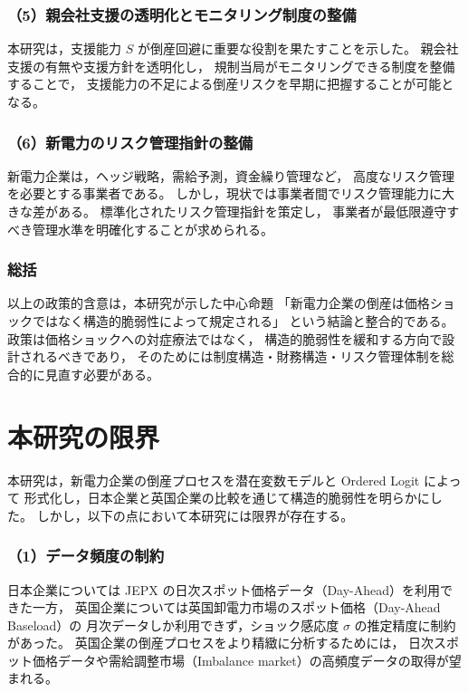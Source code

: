 \subsubsection*{（5）親会社支援の透明化とモニタリング制度の整備}

本研究は，支援能力 $S$ が倒産回避に重要な役割を果たすことを示した。
親会社支援の有無や支援方針を透明化し，
規制当局がモニタリングできる制度を整備することで，
支援能力の不足による倒産リスクを早期に把握することが可能となる。

\subsubsection*{（6）新電力のリスク管理指針の整備}

新電力企業は，ヘッジ戦略，需給予測，資金繰り管理など，
高度なリスク管理を必要とする事業者である。
しかし，現状では事業者間でリスク管理能力に大きな差がある。
標準化されたリスク管理指針を策定し，
事業者が最低限遵守すべき管理水準を明確化することが求められる。

\subsubsection*{総括}

以上の政策的含意は，本研究が示した中心命題
「新電力企業の倒産は価格ショックではなく構造的脆弱性によって規定される」
という結論と整合的である。
政策は価格ショックへの対症療法ではなく，
構造的脆弱性を緩和する方向で設計されるべきであり，
そのためには制度構造・財務構造・リスク管理体制を総合的に見直す必要がある。


\section{本研究の限界}

本研究は，新電力企業の倒産プロセスを潜在変数モデルと Ordered Logit によって
形式化し，日本企業と英国企業の比較を通じて構造的脆弱性を明らかにした。
しかし，以下の点において本研究には限界が存在する。

\subsubsection*{（1）データ頻度の制約}

日本企業については JEPX の日次スポット価格データ（Day-Ahead）を利用できた一方，
英国企業については英国卸電力市場のスポット価格（Day-Ahead Baseload）の
月次データしか利用できず，ショック感応度 $\sigma$ の推定精度に制約があった。
英国企業の倒産プロセスをより精緻に分析するためには，
日次スポット価格データや需給調整市場（Imbalance market）の高頻度データの取得が望まれる。

